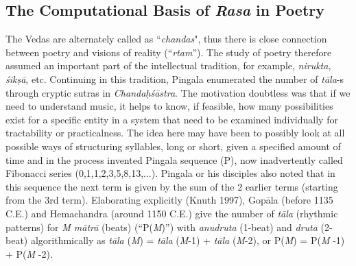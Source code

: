 \subsection{The Computational Basis of \textsl{Rasa} in Poetry}\label{chap7-sec5.1}

The Vedas are alternately called as “\textsl{chandas}", thus there is close connection between poetry and visions of reality (“\textsl{rtam}”). The study of poetry therefore assumed an important part of the intellectual tradition, for example, \textsl{nirukta}, \textsl{śikṣā}, etc. Continuing in this tradition, Pingala enumerated the number of \textsl{tāla}-s through cryptic sutras in \textsl{Chandaḥśāstra}. The motivation doubtless was that if we need to understand music, it helps to know, if feasible, how many possibilities exist for a specific entity in a system that need to be examined individually for tractability or practicalness. The idea here may have been to possibly look at all possible ways of structuring syllables, long or short, given a specified amount of time and in the process invented Pingala sequence (P), now inadvertently called Fibonacci series (0,1,1,2,3,5,8,13,...). Pingala or his disciples also noted that in this sequence the next term is given by the sum of the 2 earlier terms (starting from the 3rd term). Elaborating explicitly (Knuth 1997), Gopāla (before 1135 C.E.) and Hemachandra (around 1150 C.E.) give the number of \textsl{tāla} (rhythmic patterns) for \textsl{M mātrā} (beats) (“P(\textsl{M})”) with \textsl{anudruta} (1-beat) and \textsl{druta} (2-beat) algorithmically as \textsl{tāla} (\textsl{M}) = \textsl{tāla} (\textsl{M}-1) + \textsl{tāla} (\textsl{M}-2), or P(\textsl{M}) = P(\textsl{M} -1) + P(\textsl{M} -2).

